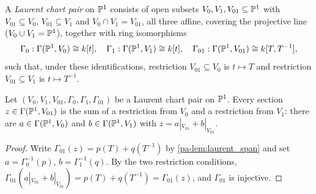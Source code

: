 \begin{definition}
  \label{pa-def:LaurentChartPair}
  \leanok

  A \emph{Laurent chart pair} on \(\mathbb{P}^1\) consists of open subsets
  \(V_0, V_1, V_{01} \subseteq \mathbb{P}^1\) with \(V_{01} \subseteq V_0\),
  \(V_{01} \subseteq V_1\) and \(V_0 \cap V_1 = V_{01}\), all three affine, covering the
  projective line (\(V_0 \cup V_1 = \mathbb{P}^1\)), together with ring isomorphisms
  \[
    \Gamma_0 : \Gamma(\mathbb{P}^1, V_0) \cong k[t], \quad
    \Gamma_1 : \Gamma(\mathbb{P}^1, V_1) \cong k[t], \quad
    \Gamma_{01} : \Gamma(\mathbb{P}^1, V_{01}) \cong k[T, T^{-1}],
  \]
  such that, under these identifications, restriction \(V_{01} \subseteq V_0\) is
  \(t \mapsto T\) and restriction \(V_{01} \subseteq V_1\) is \(t \mapsto T^{-1}\).
\end{definition}

\begin{theorem}
  \label{pa-thm:laurentChartPair_span}
  \leanok

  Let \((V_0, V_1, V_{01}, \Gamma_0, \Gamma_1, \Gamma_{01})\) be a Laurent chart pair on
  \(\mathbb{P}^1\). Every section \(z \in \Gamma(\mathbb{P}^1, V_{01})\) is the sum of a restriction from
  \(V_0\) and a restriction from \(V_1\): there are \(a \in \Gamma(\mathbb{P}^1, V_0)\) and
  \(b \in \Gamma(\mathbb{P}^1, V_1)\) with \(z = a|_{V_{01}} + b|_{V_{01}}\).
\end{theorem}
\begin{proof}
  \leanok
  Write \(\Gamma_{01}(z) = p(T) + q(T^{-1})\) by \ref{pa-lem:laurent_span} and set
  \(a = \Gamma_0^{-1}(p)\), \(b = \Gamma_1^{-1}(q)\). By the two restriction conditions,
  \(\Gamma_{01}(a|_{V_{01}} + b|_{V_{01}}) = p(T) + q(T^{-1}) = \Gamma_{01}(z)\), and
  \(\Gamma_{01}\) is injective.
\end{proof}

